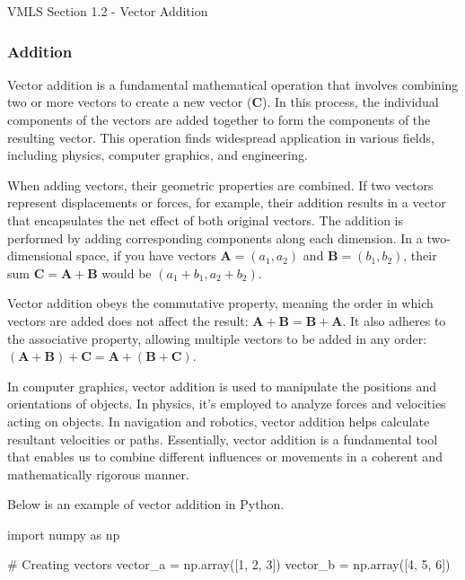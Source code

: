 \begin{notes}{VMLS Section 1.2 - Vector Addition}
    \subsubsection*{Addition}

    Vector addition is a fundamental mathematical operation that involves combining two or more vectors to create a new vector ($\mathbf{C}$). In this process, the individual components of the vectors are 
    added together to form the components of the resulting vector. This operation finds widespread application in various fields, including physics, computer graphics, and engineering.

    When adding vectors, their geometric properties are combined. If two vectors represent displacements or forces, for example, their addition results in a vector that encapsulates the net effect of both 
    original vectors. The addition is performed by adding corresponding components along each dimension. In a two-dimensional space, if you have vectors $\mathbf{A} = (a_1, a_2)$ and $\mathbf{B} = (b_1, b_2)$, 
    their sum $\mathbf{C} = \mathbf{A} + \mathbf{B}$ would be $(a_1 + b_1, a_2 + b_2)$.  
    
    Vector addition obeys the commutative property, meaning the order in which vectors are added does not affect the result: $\mathbf{A} + \mathbf{B} = \mathbf{B} + \mathbf{A}$. It also adheres to the associative 
    property, allowing multiple vectors to be added in any order: $(\mathbf{A} + \mathbf{B}) + \mathbf{C} = \mathbf{A} + (\mathbf{B} + \mathbf{C})$.
    
    In computer graphics, vector addition is used to manipulate the positions and orientations of objects. In physics, it's employed to analyze forces and velocities acting on objects. In navigation and robotics, 
    vector addition helps calculate resultant velocities or paths. Essentially, vector addition is a fundamental tool that enables us to combine different influences or movements in a coherent and mathematically 
    rigorous manner.

    \begin{highlight}
        Below is an example of vector addition in Python.

    \begin{code}[Python]
    import numpy as np

    # Creating vectors
    vector_a = np.array([1, 2, 3])
    vector_b = np.array([4, 5, 6])
    

\end{code}
\end{highlight}
\end{notes}
